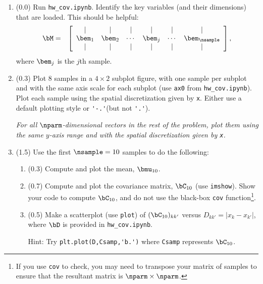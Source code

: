 \documentclass[11pt,titlepage,fleqn]{article}
\newcommand{\tfile}{{\tt hw\_cov.ipynb}}
\begin{document}
\begin{enumerate}

\item (0.0) Run \tfile. Identify the key variables (and their dimensions) that are loaded. This should be helpful:
%
\begin{eqnarray}
\bM &=& 
\left[ \begin{array}{cccccc}
| & | & | & | & | & | \\
\bem_1 & \bem_2 & \cdots & \bem_j & \cdots & \bem_\nsample \\
| & | & | & | & | & | \\
\end{array} \right],
\end{eqnarray}
%
where $\bem_j$ is the $j$th sample.

\item (0.3) Plot 8 samples in a $4 \times 2$ subplot figure, with one sample per subplot and with the same axis scale for each subplot (use \verb+ax0+ from \tfile). Plot each sample using the spatial discretization given by \verb+x+. Either use a default plotting style or \verb+'-.'+(but not \verb+'.'+).

{\em For all $\nparm$-dimensional vectors in the rest of the problem, plot them using the same $y$-axis range and with the spatial discretization given by \verb+x+.}

\label{samps}


\item (1.5) Use the first $\nsample=10$ samples to do the following:
%
\begin{enumerate}
\item (0.3) Compute and plot the mean, $\bmu_{10}$.
\item (0.7) Compute and plot the covariance matrix, $\bC_{10}$ (use \verb+imshow+). Show your code to compute $\bC_{10}$, and do not use the black-box \verb+cov+ function\footnote{If you use {\tt cov} to check, you may need to transpose your matrix of samples to ensure that the resultant matrix is $\nparm \times \nparm$.}.
\item (0.5) Make a scatterplot (use \verb+plot+) of $(\bC_{10})_{kk'}$ versus $D_{kk'} = |x_k - x_{k'}|$, where $\bD$ is provided in \tfile. 

Hint: Try \verb+plt.plot(D,Csamp,'b.')+ where \verb+Csamp+ represents $\bC_{10}$.
\end{enumerate}



\end{enumerate}
\end{document}
